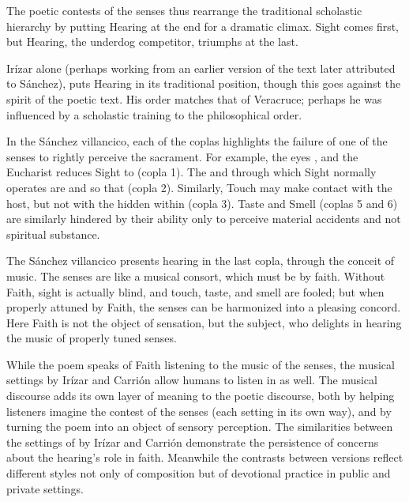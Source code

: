 The poetic contests of the senses thus rearrange the traditional scholastic
hierarchy by putting Hearing at the end for a dramatic climax.
Sight comes first, but Hearing, the underdog competitor, triumphs at the
last.%
\begin{Footnote}
    Irízar alone (perhaps working from an earlier version of the text later
    attributed to Sánchez), puts Hearing in its traditional position, though
    this goes against the spirit of the poetic text.  
    His order matches that of Veracruce; perhaps he was influenced by a
    scholastic training to  the philosophical order.
\end{Footnote}
In the Sánchez villancico, each of the coplas highlights the failure of one of
the senses to rightly perceive the sacrament.
For example, the eyes , and the Eucharist
reduces Sight to  (copla 1).
The  and  through which Sight normally
operates are   and
 so that  (copla 2).
Similarly, Touch may make contact with the host, but not with the
 hidden within (copla 3).
Taste and Smell (coplas 5 and 6) are similarly hindered by their ability only to
perceive material accidents and not spiritual substance.


The Sánchez villancico presents hearing in the last copla, through the conceit
of music.
The senses are  like a musical consort, which must be
 by faith.
Without Faith, sight is actually blind, and touch, taste, and smell are fooled;
but when properly attuned by Faith, the senses can be harmonized into a pleasing
concord.
Here Faith is not the object of sensation, but the subject, who delights in
hearing the music of properly tuned senses.

While the poem speaks of Faith listening to the music of the senses, the musical
settings by Irízar and Carrión allow humans to listen in as well.
The musical discourse adds its own layer of meaning to the poetic discourse,
both by helping listeners imagine the contest of the senses (each setting in its
own way), and by turning the poem into an object of sensory perception.
The similarities between the settings of  by Irízar and
Carrión demonstrate the persistence of concerns about the hearing's role in
faith.
Meanwhile the contrasts  between versions reflect different styles not only of
composition but of devotional practice in public and private settings.

